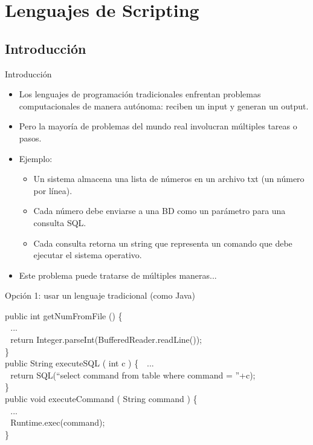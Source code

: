 \documentclass[handout]{beamer} %
\begin{document}

\section{Lenguajes de Scripting}

\subsection{Introducción}

\begin{frame}{Introducción}
  \begin{itemize}
    \item<1-> Los lenguajes de programación tradicionales enfrentan problemas computacionales de manera autónoma: reciben un input y generan un output.
    \item<2-> Pero la mayoría de problemas del mundo real involucran múltiples tareas o pasos.
    \item<3-> Ejemplo:
    \begin{itemize}
        \item Un sistema almacena una lista de números en un archivo txt (un número por línea).
        \item Cada número debe enviarse a una BD como un parámetro para una consulta SQL.
        \item Cada consulta retorna un string que representa un comando que debe ejecutar el sistema operativo.
    \end{itemize}
    \item<3-> Este problema puede tratarse de múltiples maneras...
  \end{itemize}
\end{frame}

\begin{frame}{Opción 1: usar un lenguaje tradicional (como Java)}

  {\small
  public int getNumFromFile () \{\\
  $~~~$...\\
  $~~~$return Integer.parseInt(BufferedReader.readLine());\\
  \}\\[1.5ex]
  public String executeSQL ( int c ) \{
  $~~~$...\\
  $~~~$return SQL(``select command from table where command = ''+c);\\
  \}\\[1.5ex]
  public void executeCommand ( String command ) \{\\
  $~~~$...\\
  $~~~$Runtime.exec(command);\\
  \}}
\end{frame}
\end{document}
